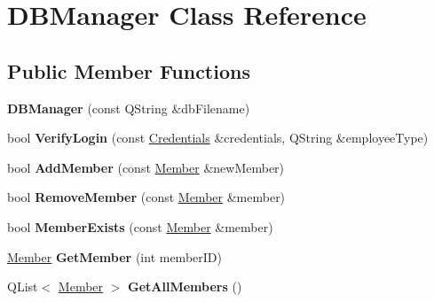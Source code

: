 \hypertarget{class_d_b_manager}{}\section{D\+B\+Manager Class Reference}
\label{class_d_b_manager}
\subsection*{Public Member Functions}
\begin{DoxyCompactItemize}
\item 
\mbox{\label{class_d_b_manager_af1069c944914668fb2bf3a0f18da556b}} 
{\bfseries D\+B\+Manager} (const Q\+String \&db\+Filename)
\item 
\mbox{\label{class_d_b_manager_ac9fc43d8d42f0de24c2daae2135195aa}} 
bool {\bfseries Verify\+Login} (const \mbox{\hyperlink{class_credentials}{Credentials}} \&credentials, Q\+String \&employee\+Type)
\item 
\mbox{\label{class_d_b_manager_af7cfff555a5cd6c0cb191fe377033062}} 
bool {\bfseries Add\+Member} (const \mbox{\hyperlink{class_member}{Member}} \&new\+Member)
\item 
\mbox{\label{class_d_b_manager_af0857aec484261da158486c6609a9637}} 
bool {\bfseries Remove\+Member} (const \mbox{\hyperlink{class_member}{Member}} \&member)
\item 
\mbox{\label{class_d_b_manager_abca86413cfbad97d5c8540d675fcc43a}} 
bool {\bfseries Member\+Exists} (const \mbox{\hyperlink{class_member}{Member}} \&member)
\item 
\mbox{\label{class_d_b_manager_ada9b21cf66caf785534d0072acb14530}} 
\mbox{\hyperlink{class_member}{Member}} {\bfseries Get\+Member} (int member\+ID)
\item 
\mbox{\label{class_d_b_manager_ad76ac83a09292bf6cbceab84a94f86cd}} 
Q\+List$<$ \mbox{\hyperlink{class_member}{Member}} $>$ {\bfseries Get\+All\+Members} ()
\item 
\mbox{\label{class_d_b_manager_ab49f55667f4141f5cdb8da1c7e64fba7}} 

\end{DoxyCompactItemize}
